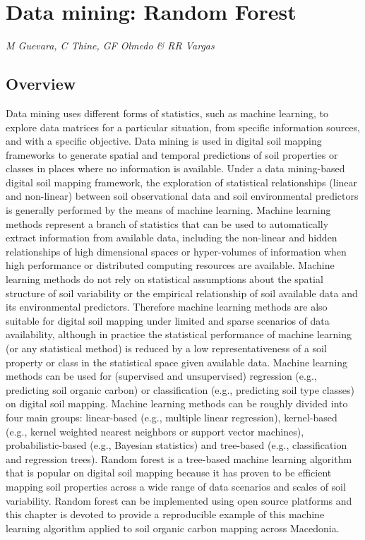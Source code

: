 \documentclass[10pt,b5paper,]{book}
\theoremstyle{definition}
\theoremstyle{definition}
\theoremstyle{definition}
\theoremstyle{remark}
\begin{document}
\hypertarget{rf}{%
\section{Data mining: Random Forest}\label{rf}}

\emph{M Guevara, C Thine, GF Olmedo \& RR Vargas}

\hypertarget{overview-2}{%
\subsection{Overview}\label{overview-2}}

Data mining uses different forms of statistics, such as machine
learning, to explore data matrices for a particular situation, from
specific information sources, and with a specific objective. Data mining
is used in digital soil mapping frameworks to generate spatial and
temporal predictions of soil properties or classes in places where no
information is available. Under a data mining-based digital soil mapping
framework, the exploration of statistical relationships (linear and
non-linear) between soil observational data and soil environmental
predictors is generally performed by the means of machine learning.
Machine learning methods represent a branch of statistics that can be
used to automatically extract information from available data, including
the non-linear and hidden relationships of high dimensional spaces or
hyper-volumes of information when high performance or distributed
computing resources are available. Machine learning methods do not rely
on statistical assumptions about the spatial structure of soil
variability or the empirical relationship of soil available data and its
environmental predictors. Therefore machine learning methods are also
suitable for digital soil mapping under limited and sparse scenarios of
data availability, although in practice the statistical performance of
machine learning (or any statistical method) is reduced by a low
representativeness of a soil property or class in the statistical space
given available data. Machine learning methods can be used for
(supervised and unsupervised) regression (e.g., predicting soil organic
carbon) or classification (e.g., predicting soil type classes) on
digital soil mapping. Machine learning methods can be roughly divided
into four main groups: linear-based (e.g., multiple linear regression),
kernel-based (e.g., kernel weighted nearest neighbors or support vector
machines), probabilistic-based (e.g., Bayesian statistics) and
tree-based (e.g., classification and regression trees). Random forest is
a tree-based machine learning algorithm that is popular on digital soil
mapping because it has proven to be efficient mapping soil properties
across a wide range of data scenarios and scales of soil variability.
Random forest can be implemented using open source platforms and this
chapter is devoted to provide a reproducible example of this machine
learning algorithm applied to soil organic carbon mapping across
Macedonia.
\end{document}
